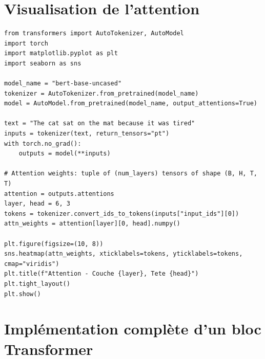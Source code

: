 \section{Visualisation de l'attention}
\label{sec:att:visualisation}

\begin{codeblock}[title=\textbf{Visualisation des poids d'attention avec Hugging Face}]
\begin{verbatim}
from transformers import AutoTokenizer, AutoModel
import torch
import matplotlib.pyplot as plt
import seaborn as sns

model_name = "bert-base-uncased"
tokenizer = AutoTokenizer.from_pretrained(model_name)
model = AutoModel.from_pretrained(model_name, output_attentions=True)

text = "The cat sat on the mat because it was tired"
inputs = tokenizer(text, return_tensors="pt")
with torch.no_grad():
    outputs = model(**inputs)

# Attention weights: tuple of (num_layers) tensors of shape (B, H, T, T)
attention = outputs.attentions
layer, head = 6, 3
tokens = tokenizer.convert_ids_to_tokens(inputs["input_ids"][0])
attn_weights = attention[layer][0, head].numpy()

plt.figure(figsize=(10, 8))
sns.heatmap(attn_weights, xticklabels=tokens, yticklabels=tokens, cmap="viridis")
plt.title(f"Attention - Couche {layer}, Tete {head}")
plt.tight_layout()
plt.show()
\end{verbatim}
\end{codeblock}

\section{Impl\'ementation compl\`ete d'un bloc Transformer}
\label{sec:att:implementation}

